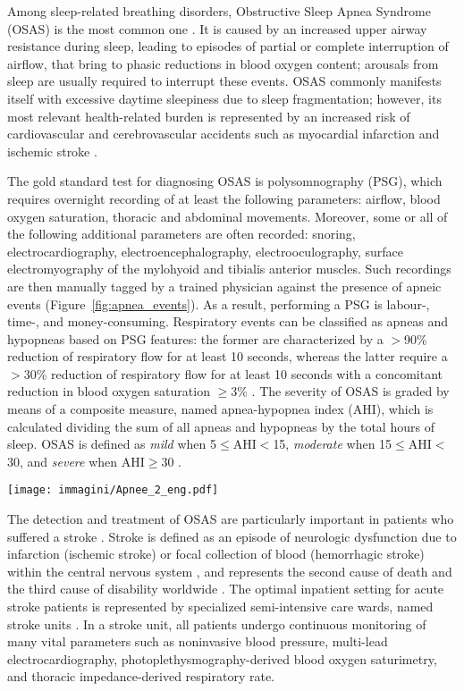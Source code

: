 \documentclass[5p,twocolumn,lefttitle]{elsarticle}
\begin{document}
Among sleep-related breathing disorders, Obstructive Sleep Apnea Syndrome (OSAS) is the most common one \cite{pmid27568340}. It is caused by an increased upper airway resistance during sleep, leading to episodes of partial or complete interruption of airflow, that bring to phasic reductions in blood oxygen content; arousals from sleep are usually required to interrupt these events. OSAS commonly manifests itself with excessive daytime sleepiness due to sleep fragmentation; however, its most relevant health-related burden is represented by an increased risk of cardiovascular and cerebrovascular accidents such as myocardial infarction and ischemic stroke \cite{pmid24321805}.


The gold standard test for diagnosing OSAS is polysomnography (PSG), which requires overnight recording of at least the following parameters: airflow, blood oxygen saturation, thoracic and abdominal movements. Moreover, some or all of the following additional parameters are often recorded: snoring, electrocardiography, electroencephalography, electrooculography, surface electromyography of the mylohyoid and tibialis anterior muscles. 
Such recordings are then manually tagged by a trained physician against the presence of apneic events (Figure~\ref{fig:apnea_events}). 
As a result, performing a PSG is labour-, time-, and money-consuming.
Respiratory events can be classified as apneas and hypopneas based on PSG features: the former are characterized by a $>$90\% reduction of respiratory flow for at least 10 seconds, whereas the latter require a $>$30\% reduction of respiratory flow for at least 10 seconds with a concomitant reduction in blood oxygen saturation $\geq$3\% \cite{pmid23066376}. The severity of OSAS is graded by means of a composite measure, named apnea-hypopnea index (AHI), which is calculated dividing the sum of all apneas and hypopneas by the total hours of sleep. OSAS is defined as \emph{mild} when 5$\leq$AHI$<$15, \emph{moderate} when 15$\leq$AHI$<$30, and \emph{severe} when AHI$\geq$30 \cite{PMID:28211654}.

\begin{figure*}[t]
    \centering
    \texttt{[image: immagini/Apnee\_2\_eng.pdf]}
    \caption{Polysomnographic recording showing some different apnea events.}
    \label{fig:apnea_events}
\end{figure*}

The detection and treatment of OSAS are particularly important in patients who suffered a stroke \cite{pmid29523641}. Stroke is defined as an episode of neurologic dysfunction due to infarction (ischemic stroke) 
or focal collection of blood (hemorrhagic stroke) 
within the central nervous system \cite{pmid23652265}, and represents the second cause of death and the third cause of disability worldwide \cite{GlobalBurdenOfDisease}. The optimal inpatient setting for acute stroke patients is represented by specialized semi-intensive care wards, named stroke units \cite{pmid29367334}. In a stroke unit, all patients undergo continuous monitoring of many vital parameters such as noninvasive blood pressure, multi-lead electrocardiography, photoplethysmography-derived blood oxygen saturimetry, and thoracic impedance-derived respiratory rate.
\end{document}
